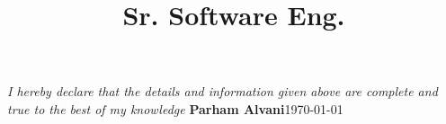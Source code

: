 \documentclass[11pt, a4paper, color, final]{moderncv}
\title{Sr. Software Eng.}
\begin{document}
\maketitle







%



% 
%
% 
%
% 

\emptysection{}\closesection{}
\vfill
\textit{I hereby declare that the details and information given above are complete and true to the best of my knowledge}
\linebreak
\textbf{Parham Alvani}\hfil\today
\end{document}
